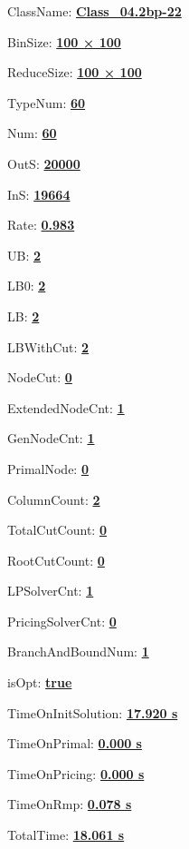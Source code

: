\documentclass[11pt]{article}
\begin{document}
\pagestyle{empty}


ClassName: \underline{\textbf{Class_04.2bp-22}}
\par
BinSize: \underline{\textbf{100 × 100}}
\par
ReduceSize: \underline{\textbf{100 × 100}}
\par
TypeNum: \underline{\textbf{60}}
\par
Num: \underline{\textbf{60}}
\par
OutS: \underline{\textbf{20000}}
\par
InS: \underline{\textbf{19664}}
\par
Rate: \underline{\textbf{0.983}}
\par
UB: \underline{\textbf{2}}
\par
LB0: \underline{\textbf{2}}
\par
LB: \underline{\textbf{2}}
\par
LBWithCut: \underline{\textbf{2}}
\par
NodeCut: \underline{\textbf{0}}
\par
ExtendedNodeCnt: \underline{\textbf{1}}
\par
GenNodeCnt: \underline{\textbf{1}}
\par
PrimalNode: \underline{\textbf{0}}
\par
ColumnCount: \underline{\textbf{2}}
\par
TotalCutCount: \underline{\textbf{0}}
\par
RootCutCount: \underline{\textbf{0}}
\par
LPSolverCnt: \underline{\textbf{1}}
\par
PricingSolverCnt: \underline{\textbf{0}}
\par
BranchAndBoundNum: \underline{\textbf{1}}
\par
isOpt: \underline{\textbf{true}}
\par
TimeOnInitSolution: \underline{\textbf{17.920 s}}
\par
TimeOnPrimal: \underline{\textbf{0.000 s}}
\par
TimeOnPricing: \underline{\textbf{0.000 s}}
\par
TimeOnRmp: \underline{\textbf{0.078 s}}
\par
TotalTime: \underline{\textbf{18.061 s}}
\par
\newpage
\end{document}
